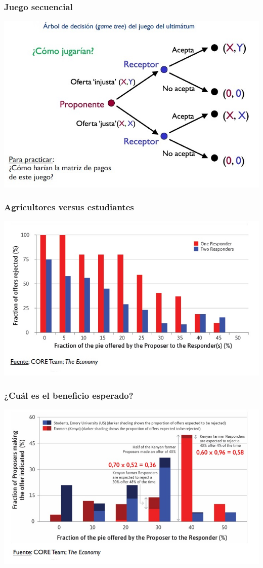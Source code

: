 \documentclass{beamer}
\begin{document}
\begin{frame}
\frametitle{ Juego secuencial}
\centering
\includegraphics[scale=0.6]{Slides Principios de Economia/Figures/Tema_03_29_arbol.jpg}
\end{frame}

\begin{frame}
\frametitle{ Agricultores versus estudiantes}
\centering
\includegraphics[scale=0.6]{Slides Principios de Economia/Figures/Tema_03_32_ultimatum.jpg}
\end{frame}

\begin{frame}
\frametitle{ ¿Cuál es el beneficio esperado?}
\centering
\includegraphics[scale=0.6]{Slides Principios de Economia/Figures/Tema_03_31_ultimatum.jpg}
\end{frame}
\end{document}
